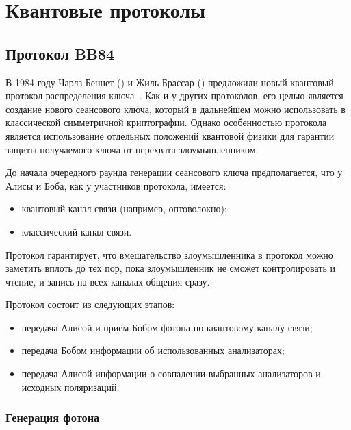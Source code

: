 \section{Квантовые протоколы}

\subsection{Протокол BB84}

В 1984 году Чарлз Беннет () и Жиль Брассар () предложили новый квантовый протокол распределения ключа~\cite{Bennett:Brassard:1984}. Как и у других протоколов, его целью является создание нового сеансового ключа, который в дальнейшем можно использовать в классической симметричной криптографии. Однако особенностью протокола является использование отдельных положений квантовой физики для гарантии защиты получаемого ключа от перехвата злоумышленником.

До начала очередного раунда генерации сеансового ключа предполагается, что у Алисы и Боба, как у участников протокола, имеется:

\begin{itemize}
	\item квантовый канал связи (например, оптоволокно);
	\item классический канал связи.
\end{itemize}

Протокол гарантирует, что вмешательство злоумышленника в протокол можно заметить вплоть до тех пор, пока злоумышленник не сможет контролировать и чтение, и запись на всех каналах общения сразу.

Протокол состоит из следующих этапов:

\begin{itemize}
	\item передача Алисой и приём Бобом фотона по квантовому каналу связи;
	\item передача Бобом информации об использованных анализаторах;
	\item передача Алисой информации о совпадении выбранных анализаторов и исходных поляризаций.
\end{itemize}


\subsubsection{Генерация фотона}

